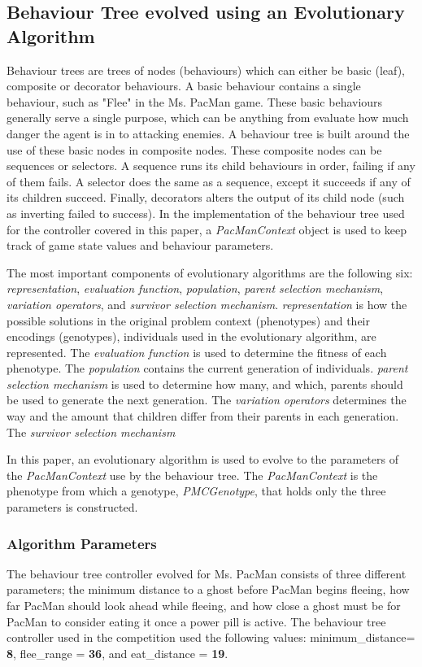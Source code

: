 \subsection{Behaviour Tree evolved using an Evolutionary Algorithm}
Behaviour trees are trees of nodes (behaviours) which can either be basic (leaf), composite or decorator behaviours. A basic behaviour contains a single behaviour, such as "Flee" in the Ms. PacMan game. These basic behaviours generally serve a single purpose, which can be anything from evaluate how much danger the agent is in to attacking enemies. A behaviour tree is built around the use of these basic nodes in composite nodes. These composite nodes can be sequences or selectors. A sequence runs its child behaviours in order, failing if any of them fails. A selector does the same as a sequence, except it succeeds if any of its children succeed. Finally, decorators alters the output of its child node (such as inverting failed to success)\cite{simpsonBT}. In the implementation of the behaviour tree used for the controller covered in this paper, a \textit{PacManContext} object is used to keep track of game state values and behaviour parameters.

The most important components of evolutionary algorithms are the following six: \textit{representation}, \textit{evaluation function}, \textit{population}, \textit{parent selection mechanism}, \textit{variation operators}, and \textit{survivor selection mechanism}\cite{eiben2003introduction}. \textit{representation} is how the possible solutions in the original problem context (phenotypes) and their encodings (genotypes), individuals used in the evolutionary algorithm, are represented. The \textit{evaluation function} is used to determine the fitness of each phenotype. The \textit{population} contains the current generation of individuals. \textit{parent selection mechanism} is used to determine how many, and which, parents should be used to generate the next generation. The \textit{variation operators} determines the way and the amount that children differ from their parents in each generation. The \textit{survivor selection mechanism}

In this paper, an evolutionary algorithm is used to evolve to the parameters of the \textit{PacManContext} use by the behaviour tree. The \textit{PacManContext} is the phenotype from which a genotype, \textit{PMCGenotype}, that holds only the three parameters is constructed. 

\subsubsection{Algorithm Parameters}
The behaviour tree controller evolved for Ms. PacMan consists of three different parameters; the minimum distance to a ghost before PacMan begins fleeing, how far PacMan should look ahead while fleeing, and how close a ghost must be for PacMan to consider eating it once a power pill is active. The behaviour tree controller used in the competition used the following values: minimum\_distance= \textbf{8}, flee\_range = \textbf{36}, and eat\_distance = \textbf{19}.

